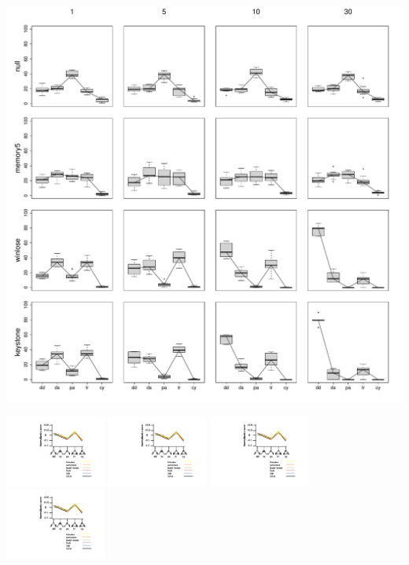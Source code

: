 \documentclass{scrartcl}
\begin{document}
\flushleft
\includegraphics[width=17cm]{triads.pdf} 

\vspace{-0.3cm}
\hspace{1cm}
\includegraphics[width=3.3cm,clip=true,trim={13cm 9.41cm 5.68cm 9.72cm}]{triads-bild.pdf}
\hspace{0.38cm}
\includegraphics[width=3.3cm,clip=true,trim={13cm 9.41cm 5.68cm 9.72cm}]{triads-bild.pdf}
\hspace{0.42cm}
\includegraphics[width=3.3cm,clip=true,trim={13cm 9.41cm 5.68cm 9.72cm}]{triads-bild.pdf}
\hspace{0.37cm}
\includegraphics[width=3.3cm,clip=true,trim={13cm 9.41cm 5.68cm 9.72cm}]{triads-bild.pdf}
\end{document}
